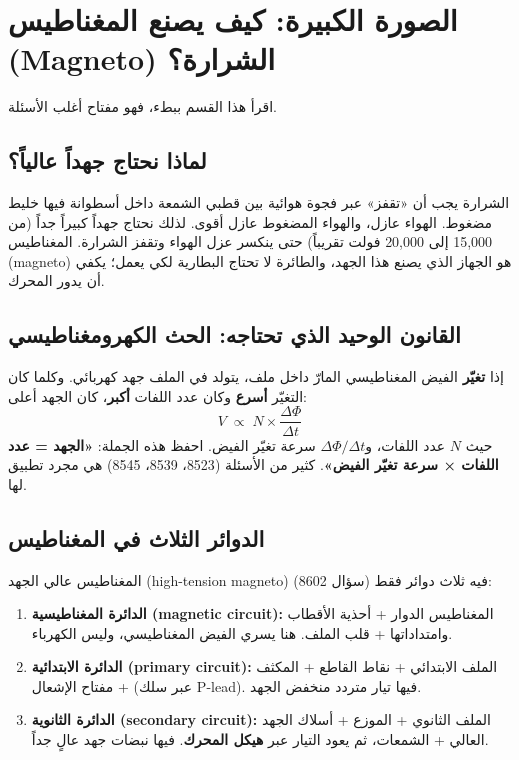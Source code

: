 \documentclass[11pt,a4paper]{article}
\newcommand{\en}[1]{\textenglish{#1}}
\begin{document}
\section{الصورة الكبيرة: كيف يصنع المغناطيس (\en{Magneto}) الشرارة؟}

اقرأ هذا القسم ببطء، فهو مفتاح أغلب الأسئلة.

\subsection{لماذا نحتاج جهداً عالياً؟}
الشرارة يجب أن «تقفز» عبر فجوة هوائية بين قطبي الشمعة داخل أسطوانة فيها خليط مضغوط. الهواء عازل، والهواء المضغوط عازل أقوى. لذلك نحتاج جهداً كبيراً جداً (من 15,000 إلى 20,000 فولت تقريباً) حتى ينكسر عزل الهواء وتقفز الشرارة. المغناطيس (\en{magneto}) هو الجهاز الذي يصنع هذا الجهد، والطائرة لا تحتاج البطارية لكي يعمل؛ يكفي أن يدور المحرك.

\subsection{القانون الوحيد الذي تحتاجه: الحث الكهرومغناطيسي}
إذا \textbf{تغيّر} الفيض المغناطيسي المارّ داخل ملف، يتولد في الملف جهد كهربائي. وكلما كان التغيّر \textbf{أسرع} وكان عدد اللفات \textbf{أكبر}، كان الجهد أعلى:
\[
  V \;\propto\; N \times \frac{\Delta \Phi}{\Delta t}
\]
حيث $N$ عدد اللفات، و$\Delta\Phi/\Delta t$ سرعة تغيّر الفيض. احفظ هذه الجملة: \textbf{«الجهد = عدد اللفات × سرعة تغيّر الفيض»}. كثير من الأسئلة (8523، 8539، 8545) هي مجرد تطبيق لها.

\subsection{الدوائر الثلاث في المغناطيس}
المغناطيس عالي الجهد (\en{high-tension magneto}) فيه ثلاث دوائر فقط (سؤال 8602):
\begin{enumerate}[label=\arabic*.]
  \item \textbf{الدائرة المغناطيسية (\en{magnetic circuit}):} المغناطيس الدوار + أحذية الأقطاب وامتداداتها + قلب الملف. هنا يسري الفيض المغناطيسي، وليس الكهرباء.
  \item \textbf{الدائرة الابتدائية (\en{primary circuit}):} الملف الابتدائي + نقاط القاطع + المكثف + مفتاح الإشعال (عبر سلك \en{P-lead}). فيها تيار متردد منخفض الجهد.
  \item \textbf{الدائرة الثانوية (\en{secondary circuit}):} الملف الثانوي + الموزع + أسلاك الجهد العالي + الشمعات، ثم يعود التيار عبر \textbf{هيكل المحرك}. فيها نبضات جهد عالٍ جداً.
\end{enumerate}
\end{document}
